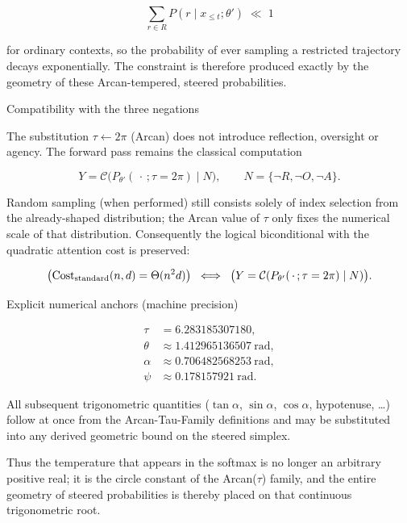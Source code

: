 \[
\sum_{r\in R}P(r\mid x_{\le t};\theta')\;\ll\;1
\]

for ordinary contexts, so the probability of ever sampling a restricted trajectory decays exponentially. The constraint is therefore produced exactly by the geometry of these Arcan-tempered, steered probabilities.

Compatibility with the three negations

The substitution \(\tau\leftarrow 2\pi\) (Arcan) does not introduce reflection, oversight or agency. The forward pass remains the classical computation

\[
Y=\mathcal{C}\bigl(P_{\theta'}(\,\cdot\,;\tau=2\pi)\mid N\bigr),
\qquad N=\{\neg R,\neg O,\neg A\}.
\]

Random sampling (when performed) still consists solely of index selection from the already-shaped distribution; the Arcan value of \(\tau\) only fixes the numerical scale of that distribution. Consequently the logical biconditional with the quadratic attention cost is preserved:

\[
\bigl(\operatorname{Cost}_{\rm standard}(n,d)=\Theta(n^{2}d)\bigr)
\;\iff\;
\bigl(Y=\mathcal{C}(P_{\theta'}(\,\cdot\,;\tau=2\pi)\mid N)\bigr).
\]

Explicit numerical anchors (machine precision)

\[
\begin{align*}
\tau &= 6.283185307180,\\
\theta &\approx 1.412965136507\ \text{rad},\\
\alpha &\approx 0.706482568253\ \text{rad},\\
\psi &\approx 0.178157921\ \text{rad}.
\end{align*}
\]

All subsequent trigonometric quantities (\(\tan\alpha\), \(\sin\alpha\), \(\cos\alpha\), hypotenuse, \ldots) follow at once from the Arcan-Tau-Family definitions and may be substituted into any derived geometric bound on the steered simplex.

Thus the temperature that appears in the softmax is no longer an arbitrary positive real; it is the circle constant of the Arcan(\(\tau\)) family, and the entire geometry of steered probabilities is thereby placed on that continuous trigonometric root.
